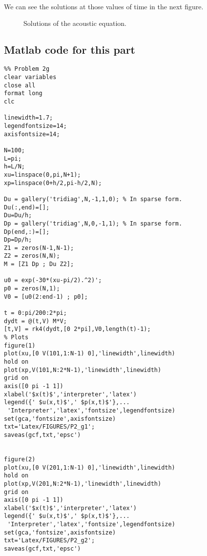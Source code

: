 \begin{enumerate}
We can see the solutions at those values of time in the next figure.
\begin{figure}[H]
\centering     %
\hspace*{\fill}
\subfigure[Solutions at $t = \pi/2$.]{\texttt{[image: P2\_g1]}}
\hfill
\subfigure[Solutions at $t = \pi$.]{\texttt{[image: P2\_g2]}}
\hspace*{\fill}

\hspace*{\fill}
\subfigure[Solutions at $t = 3\pi/2$.]{\texttt{[image: P2\_g3]}}
\hfill
\subfigure[Solutions at $t = 2\pi$.]{\texttt{[image: P2\_g4]}}
\hspace*{\fill}
\caption{Solutions of the acoustic equation.}
\end{figure}
\subsection*{Matlab code for this part}
\begin{verbatim}
%% Problem 2g
clear variables
close all
format long
clc

linewidth=1.7;
legendfontsize=14;
axisfontsize=14;

N=100;
L=pi;
h=L/N;
xu=linspace(0,pi,N+1);
xp=linspace(0+h/2,pi-h/2,N);

Du = gallery('tridiag',N,-1,1,0); % In sparse form.
Du(:,end)=[];
Du=Du/h;
Dp = gallery('tridiag',N,0,-1,1); % In sparse form.
Dp(end,:)=[];
Dp=Dp/h;
Z1 = zeros(N-1,N-1);
Z2 = zeros(N,N);
M = [Z1 Dp ; Du Z2];

u0 = exp(-30*(xu-pi/2).^2)';
p0 = zeros(N,1);
V0 = [u0(2:end-1) ; p0];

t = 0:pi/200:2*pi;
dydt = @(t,V) M*V;
[t,V] = rk4(dydt,[0 2*pi],V0,length(t)-1);
% Plots
figure(1)
plot(xu,[0 V(101,1:N-1) 0],'linewidth',linewidth)
hold on
plot(xp,V(101,N:2*N-1),'linewidth',linewidth)
grid on
axis([0 pi -1 1])
xlabel('$x(t)$','interpreter','latex')
legend({' $u(x,t)$',' $p(x,t)$'},...
 'Interpreter','latex','fontsize',legendfontsize)
set(gca,'fontsize',axisfontsize)
txt='Latex/FIGURES/P2_g1';
saveas(gcf,txt,'epsc')


figure(2)
plot(xu,[0 V(201,1:N-1) 0],'linewidth',linewidth)
hold on
plot(xp,V(201,N:2*N-1),'linewidth',linewidth)
grid on
axis([0 pi -1 1])
xlabel('$x(t)$','interpreter','latex')
legend({' $u(x,t)$',' $p(x,t)$'},...
 'Interpreter','latex','fontsize',legendfontsize)
set(gca,'fontsize',axisfontsize)
txt='Latex/FIGURES/P2_g2';
saveas(gcf,txt,'epsc')


\end{verbatim}
\end{enumerate}
